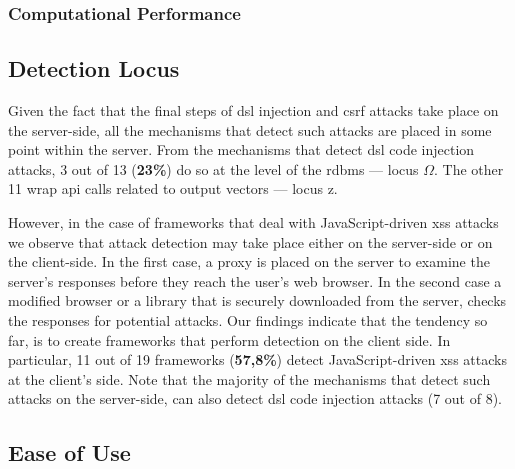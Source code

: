 \documentclass[conference]{IEEEtran}
\begin{document}



\subsubsection{Computational Performance}

\subsection{Detection Locus}

Given the fact that the final steps of
{\sc dsl} injection and {\sc csrf} attacks take place
on the server-side, all the mechanisms that detect
such attacks are placed in some point within the server.
From the mechanisms that detect {\sc dsl} code injection
attacks, 3 out of 13 ({\bf 23\%}) do so at the level
of the {\sc rdbms} --- locus $\Omega$.
The other 11 wrap {\sc api} calls related to output
vectors --- locus {\sc z}.

However, in the case of frameworks that deal
with JavaScript-driven {\sc xss} attacks
we observe that attack detection may take place
either on the server-side or on the client-side.
In the first case, a proxy is placed on the server
to examine the server's responses before they
reach the user's web browser. In the second
case a modified browser or a library that
is securely downloaded from the server,
checks the responses for potential attacks.
Our findings indicate that the tendency so far,
is to create frameworks that perform detection
on the client side. In particular, 11 out of
19 frameworks ({\bf 57,8\%}) detect JavaScript-driven
{\sc xss} attacks at the client's side.
Note that the majority of the mechanisms that
detect such attacks on the server-side, can also
detect {\sc dsl} code injection attacks (7 out of 8). 

\subsection{Ease of Use}
\end{document}

